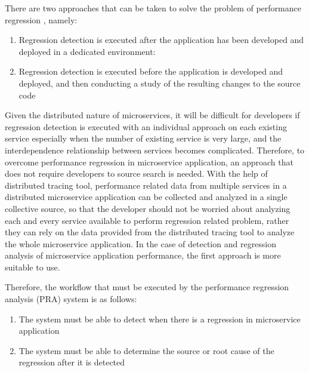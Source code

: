 \documentclass[conference]{configs/IEEEtran}
\begin{document}
There are two approaches that can be taken to solve the problem of performance regression \cite{regression-detection}, namely:
\begin{enumerate}
	\item Regression detection is executed after the application has been developed and deployed in a dedicated environment:
	\item Regression detection is executed before the application is developed and deployed, and then conducting a study of the resulting changes to the source code
\end{enumerate} 

Given the distributed nature of microservices, it will be difficult for developers if regression detection is executed with an individual approach on each existing service especially when the number of existing service is very large, and the interdependence relationship between services becomes complicated. Therefore, to overcome performance regression in microservice application, an approach that does not require developers to source search is needed. With the help of distributed tracing tool, performance related data from multiple services in a distributed microservice application can be collected and analyzed in a single collective source, so that the developer should not be worried about analyzing each and every service available to perform regression related problem, rather they can rely on the data provided from the distributed tracing tool to analyze the whole microservice application. In the case of detection and regression analysis of microservice application performance, the first approach is more suitable to use.

Therefore, the workflow that must be executed by the performance regression analysis (PRA) system is as follows:
\begin{enumerate}
	\item The system must be able to detect when there is a regression in microservice application
	\item The system must be able to determine the source or root cause of the regression after it is detected
\end{enumerate}
\end{document}

